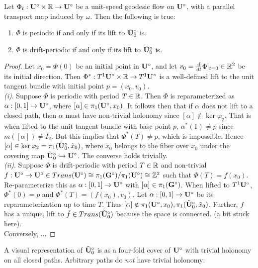 \documentclass[]{article}
\def\btUos{\btU_0^\circ}
\begin{document}
\begin{lem}
Let $\Phi_t:\mathbf{U}^\circ\times\mathbb{R}\rightarrow \mathbf{U}^\circ$ be a unit-speed geodesic flow on $\mathbf{U}^\circ$, with a parallel transport map induced by $\omega$. Then the following is true:
\begin{enumerate}[label=(\roman*)]
\item $\Phi$ is periodic if and only if its lift to $\btUos$ is.
\item $\Phi$ is drift-periodic if and only if its lift to $\btUos$ is. 
\end{enumerate}
\begin{proof}
Let $x_0=\Phi(0)$ be an initial point in $\mathbf{U}^\circ$, and let $v_0=\frac{d}{dt}\Phi|_{t=0}\in\mathbb{R}^2$ be its initial direction. Then $\Phi^*:T^1\mathbf{U}^\circ\times\mathbb{R}\rightarrow T^1\mathbf{U}^\circ$ is a well-defined lift to the unit tangent bundle with initial point $p=(x_0,v_0)$.
\\\emph{(i)}. Suppose $\Phi$ is periodic with period $T\in\mathbb{R}$. Then $\Phi$ is reparameterized as $\alpha:[0,1]\rightarrow \mathbf{U}^\circ$, where $[\alpha]\in\pi_1(\mathbf{U}^\circ,x_0)$. It follows then that if $\alpha$ does not lift to a closed path, then $\alpha$ must have non-trivial holonomy since $[\alpha]\notin\ker\varphi_2$. That is when lifted to the unit tangent bundle with base point $p$, $\alpha^*(1)\neq p$ since $m([\alpha])\neq I_2$. But this implies that $\Phi^*(T)\neq p$, which is impossible. Hence $[\alpha]\in\ker\varphi_2=\pi_1(\btUos,\tilde{x}_0)$, where $\tilde{x}_0$ belongs to the fiber over $x_0$ under the covering map $\btUos\hookrightarrow\bUs$. The converse holds trivially.
\\\emph{(ii)}. Suppose $\Phi$ is drift-periodic with period $T\in\mathbb{R}$ and non-trivial $f:\mathbf{U}^\circ\rightarrow\mathbf{U}^\circ \in Trans(\mathbf{U}^\circ)\cong\pi_1(\mathbf{G}^\circ)/\pi_1(\mathbf{U}^\circ)\cong \mathbb{Z}^2$ such that $\Phi(T)=f(x_0)$. Re-parameterize this as $\alpha:[0,1]\rightarrow\mathbf{U}^\circ$ with $[\alpha]\in\pi_1(\mathbf{G}^\circ)$.  When lifted to $T^1\mathbf{U}^\circ$, $\Phi^*(0)=p$ and $\Phi^*(T)=(f(x_0),v_0)$. Let $\alpha:[0,1]\rightarrow \mathbf{U}^\circ$ be its reparameterization up to time $T$. Thus $[\alpha]\notin \pi_1(\bUs,x_0),\pi_1(\btUos,\tilde{x}_0)$. Further, $f$ has a unique, lift to $\tilde{f}\in Trans(\btUos)$ because the space is connected. (a bit stuck here). \\
Conversely, ...
\end{proof}
\end{lem}


A visual representation of $\btUos$ is as a four-fold cover of $\mathbf{U}^\circ$ with trivial holonomy on all closed paths. Arbitrary paths do \emph{not} have trivial holonomy:
\end{document}
